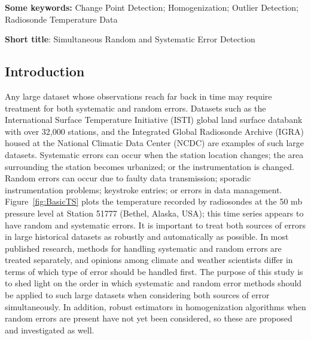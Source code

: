 \documentclass[12pt]{article}
\begin{document}

\begin{singlespacing}
\par\vfill\noindent
{\bf Some keywords:} Change Point Detection; Homogenization; Outlier Detection; Radiosonde Temperature Data

\par\medskip\noindent
{\bf Short title}:  Simultaneous Random and Systematic Error Detection

\end{singlespacing}
\clearpage\pagebreak\newpage {}
\begin{doublespacing}


\section{Introduction}

Any large dataset whose observations reach far back in time may require treatment for both systematic and random errors. Datasets such as the International Surface Temperature Initiative (ISTI) global land surface databank \cite{rennie14} with over 32,000 stations, and the Integrated Global Radiosonde Archive (IGRA) housed at the National Climatic Data Center (NCDC) \cite{durre06} are examples of such large datasets. Systematic errors can occur when the station location changes; the area surrounding the station becomes urbanized; or the instrumentation is changed. Random errors can occur due to faulty data transmission; sporadic instrumentation problems; keystroke entries; or errors in data management. Figure~\ref{fig:BasicTS} plots the temperature recorded by radiosondes at the 50 mb pressure level at Station 51777 (Bethel, Alaska, USA); this time series appears to have random and systematic errors.  It is important to treat both sources of errors in  large historical datasets as robustly and automatically as possible. In most published research, methods for handling systematic and random errors are treated separately, and opinions among climate and weather scientists differ in terms of which type of error should be handled first. The purpose of this study is to shed light on the order in which systematic and random error methods should be applied to such large datasets when considering both sources of error simultaneously. In addition, robust estimators in homogenization algorithms when random errors are present have not yet been considered, so these are proposed and investigated as well.


\end{doublespacing}
\end{document}
